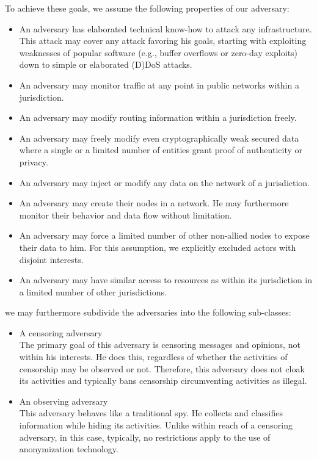 To achieve these goals, we assume the following properties of our adversary:
\begin{itemize}
	\item An adversary has elaborated technical know-how to attack any infrastructure. This attack may cover any attack favoring his goals, starting with exploiting weaknesses of popular software (e.g., buffer overflows or zero-day exploits) down to simple or elaborated (D)DoS attacks.
	\item An adversary may monitor traffic at any point in public networks within a jurisdiction.
	\item An adversary may modify routing information within a jurisdiction freely.
	\item An adversary may freely modify even cryptographically weak secured data where a single or a limited number of entities grant proof of authenticity or privacy.
	\item An adversary may inject or modify any data on the network of a jurisdiction.
	\item An adversary may create their nodes in a network. He may furthermore monitor their behavior and data flow without limitation.
	\item An adversary may force a limited number of other non-allied nodes to expose their data to him. For this assumption, we explicitly excluded actors with disjoint interests.
	\item An adversary may have similar access to resources as within its jurisdiction in a limited number of other jurisdictions.
\end{itemize}

we may furthermore subdivide the adversaries into the following sub-classes:
\begin{itemize}
	\item A censoring adversary\\
	The primary goal of this adversary is censoring messages and opinions, not within his interests. He does this, regardless of whether the activities of censorship may be observed or not. Therefore, this adversary does not cloak its activities and typically bans censorship circumventing activities as illegal.
	\item An observing adversary\\
	This adversary behaves like a traditional spy. He collects and classifies information while hiding its activities. Unlike within reach of a censoring adversary, in this case, typically, no restrictions apply to the use of anonymization technology.
\end{itemize}


